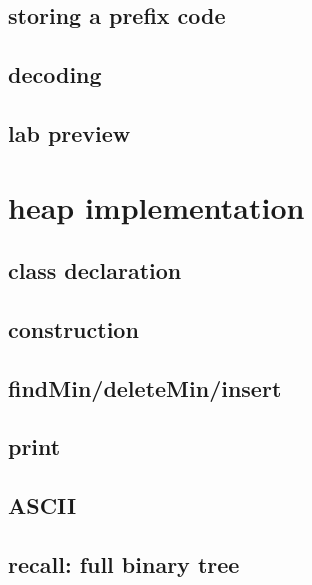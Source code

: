 





\subsection{storing a prefix code}



\subsection{decoding}

\subsection{lab preview}

\section{heap implementation}

\subsection{class declaration}

\subsection{construction}

\subsection{findMin/deleteMin/insert}

\subsection{print}



\subsection{ASCII}

\subsection{recall: full binary tree}



